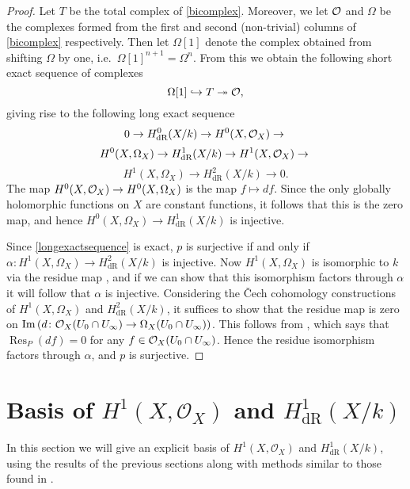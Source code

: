 \documentclass[draft, 11pt]{article} %
\theoremstyle{plain}
\theoremstyle{remark}
\newcommand{\cO}{{\cal O}}
\newcommand{\ra}{\rightarrow}
\newcommand{\cech}{\v{C}ech }
\newcommand{\hzero}{{H^0(X,\Omega_X)}}
\newcommand{\hone}{H^1(X,\mathcal{O}_X)}
\newcommand{\derhamhone}{H_{\text {dR}}^1(X/k)}
\DeclareMathOperator{\res}{Res}
\DeclareMathOperator{\Ima}{Im}
\begin{document}
\begin{proof}
Let $T$ be the total complex of \eqref{bicomplex}.
Moreover, we let $\cO$ and $\Omega$ be the complexes formed from the first and second (non-trivial) columns of \eqref{bicomplex} respectively.
Then let $\Omega[1]$ denote the complex obtained from shifting $\Omega$ by one, i.e.~$\Omega[1]^{n+1} = \Omega^n$.
From this we obtain the following short exact sequence of complexes 
\[
\Omega[1] \hookrightarrow T \twoheadrightarrow \cO,
\]
giving rise to the following long exact sequence
\begin{equation*}
0 \ra H^0_{\text {dR}}(X/k) \ra H^0(X,\cO_X) \ra \\
\end{equation*}
\begin{equation}\label{longexactsequence}
 H^0(X,\Omega_X) \ra \derhamhone \ra \hone \ra \\
\end{equation}
\begin{equation*}
 H^1(X,\Omega_X) \ra H^2_{\text {dR}}(X/k) \ra 0.
\end{equation*}
The map $H^0(X,\cO_X) \ra \hzero$ is the map $f \mapsto df$.
Since the only globally holomorphic functions on $X$ are constant functions, it follows that this is the zero map, and hence $\hzero \ra \derhamhone$ is injective.

Since \eqref{longexactsequence} is exact, $p$ is surjective if and only if $\alpha \colon H^1(X,\Omega_X) \ra H^2_{\text {dR}}(X/k)$ is injective.
Now $H^1(X,\Omega_X)$ is isomorphic to $k$ via the residue map \cite[Chap. III, Thm. 7.14.1]{hart}, and if we can show that this isomorphism factors through $\alpha$ it will follow that $\alpha$ is injective.
Considering the \cech cohomology constructions of $H^1(X,\Omega_X)$ and $H^2_{\text {dR}}(X/k)$, it suffices to show that the residue map is zero on $\Ima \left( d \colon \cO_X(U_0 \cap U_\infty) \ra \Omega_X(U_0 \cap U_\infty) \right)$.
This follows from \cite[Chap. III, Thm. 7.14.1 (b)]{hart}, which says that $\res_P(df)=0$ for any $f \in \cO_X(U_0 \cap U_\infty)$.
Hence the residue isomorphism factors through $\alpha$, and $p$ is surjective.
\end{proof}

\section{Basis of $\hone$ and $\derhamhone$}

In this section we will give an explicit basis of $\hone$ and $\derhamhone$, using the results of the previous sections along with methods similar to those found in \cite{canonicalrepresentation}.
\end{document}

